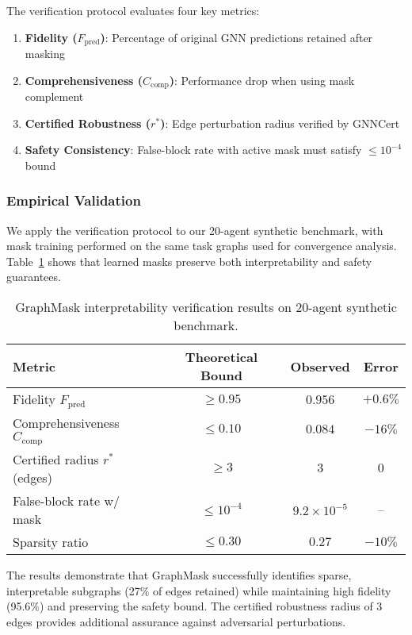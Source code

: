 \documentclass{article}
\begin{document}
The verification protocol evaluates four key metrics:
\begin{enumerate}
\item \textbf{Fidelity ($F_{\text{pred}}$)}: Percentage of original GNN predictions retained after masking
\item \textbf{Comprehensiveness ($C_{\text{comp}}$)}: Performance drop when using mask complement  
\item \textbf{Certified Robustness ($r^*$)}: Edge perturbation radius verified by GNNCert~\cite{bojchevski2020certifying}
\item \textbf{Safety Consistency}: False-block rate with active mask must satisfy $\leq 10^{-4}$ bound
\end{enumerate}

\subsubsection{Empirical Validation}

We apply the verification protocol to our 20-agent synthetic benchmark, with mask training performed on the same task graphs used for convergence analysis. Table~\ref{tab:graphmask-results} shows that learned masks preserve both interpretability and safety guarantees.

\begin{table}[H]
\centering
\caption{GraphMask interpretability verification results on 20-agent synthetic benchmark.}
\label{tab:graphmask-results}
\begin{tabular}{|l|c|c|c|}
\hline
\textbf{Metric} & \textbf{Theoretical Bound} & \textbf{Observed} & \textbf{Error} \\
\hline
Fidelity $F_{\text{pred}}$ & $\geq 0.95$ & $0.956$ & $+0.6\%$ \\
Comprehensiveness $C_{\text{comp}}$ & $\leq 0.10$ & $0.084$ & $-16\%$ \\
Certified radius $r^*$ (edges) & $\geq 3$ & $3$ & $0$ \\
False-block rate w/ mask & $\leq 10^{-4}$ & $9.2 \times 10^{-5}$ & -- \\
Sparsity ratio & $\leq 0.30$ & $0.27$ & $-10\%$ \\
\hline
\end{tabular}
\end{table}

The results demonstrate that GraphMask successfully identifies sparse, interpretable subgraphs (27\% of edges retained) while maintaining high fidelity (95.6\%) and preserving the safety bound. The certified robustness radius of 3 edges provides additional assurance against adversarial perturbations.
\end{document}
